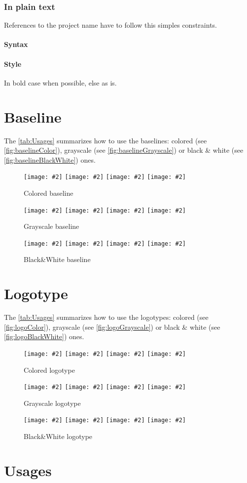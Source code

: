 \documentclass[a4paper,oneside]{article}
\newcommand{\proposition}[4][\textwidth]{%
    \begin{figure}[h]
        \centering
            \begin{minipage}[c]{#1}
                \centering
                \texttt{[image: \#2]}
                \vline{}
                \texttt{[image: \#2]}
                \vline{}
                \texttt{[image: \#2]}
                \vline{}
                \texttt{[image: \#2]}
                \caption{#3}
                \label{#4}
            \end{minipage}
    \end{figure}
}
\begin{document}
\subsubsection{In plain text}
References to the project name have to follow this simples constraints.

\paragraph{Syntax} \texttt{\vilain{}}
\paragraph{Style} \vilain{} In bold case when possible, else as is.

\section{Baseline}
The \tablename{} \vref{tab:Usages} summarizes how to use the
baselines: colored (see \figurename{} \vref{fig:baselineColor}),
grayscale (see \figurename{} \vref{fig:baselineGrayscale}) or black \&
white (see \figurename{} \vref{fig:baselineBlackWhite}) ones.

\proposition{baseline_color_cmyk.pdf}{Colored
  baseline}{fig:baselineColor}
\proposition{baseline_grayscale_cmyk.pdf}{Grayscale
  baseline}{fig:baselineGrayscale}
\proposition{baseline_black-and-white_cmyk.pdf}{Black\&White
  baseline}{fig:baselineBlackWhite}

\cleardoublepage{}
\section{Logotype}
The \tablename{} \vref{tab:Usages} summarizes how to use the
logotypes: colored (see \figurename{} \vref{fig:logoColor}),
grayscale (see \figurename{} \vref{fig:logoGrayscale}) or black \&
white (see \figurename{} \vref{fig:logoBlackWhite}) ones.

\proposition{logo_color_cmyk.pdf}{Colored logotype}{fig:logoColor}
\proposition{logo_grayscale_cmyk.pdf}{Grayscale
  logotype}{fig:logoGrayscale}
\proposition{logo_black-and-white_cmyk.pdf}{Black\&White
  logotype}{fig:logoBlackWhite}

\cleardoublepage{}
\section{Usages}
\end{document}
